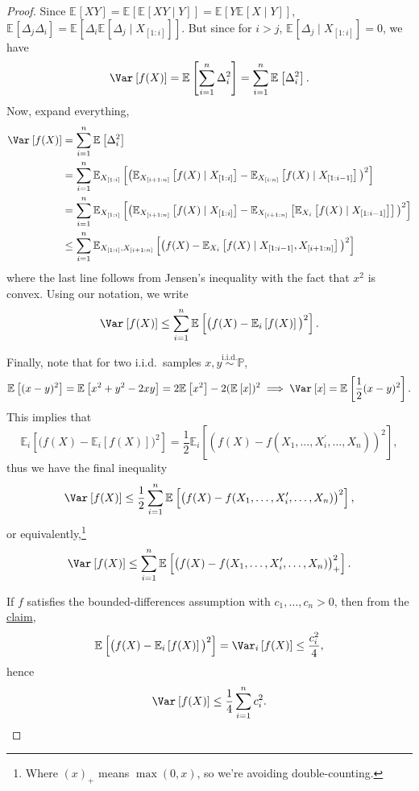 \begin{proof}
	Since \(\mathbb{E}_{}\left[XY \right] = \mathbb{E}_{}\left[\mathbb{E}_{}\left[XY \mid Y \right] \right] = \mathbb{E}_{}\left[Y \mathbb{E}_{}\left[X \mid Y \right] \right] \), \(\mathbb{E}_{}\left[\Delta _j \Delta _i \right] = \mathbb{E}_{}\left[\Delta _i \mathbb{E}_{}\left[\Delta _j \mid X_{[1:i]} \right] \right] \). But since for \(i > j\), \(\mathbb{E}_{}\left[\Delta _j \mid X_{[1:i]} \right] = 0\), we have
	\[
		\Var_{}\left[f(X) \right] = \mathbb{E}_{}\left[\sum_{i=1}^{n} \Delta _i^2 \right] = \sum_{i=1}^{n} \mathbb{E}_{}\left[\Delta _i^2 \right] .
	\]
	Now, expand everything,
	\[
		\begin{split}
			\Var_{}\left[f(X) \right]
			&= \sum_{i=1}^{n} \mathbb{E}_{}\left[\Delta _i^2 \right] \\
			&= \sum_{i=1}^{n} \mathbb{E}_{X_{[1:i]}}\left[\big( \mathbb{E}_{X_{[i+1:n]}}\left[f(X) \mid X_{[1:i]} \right] - \mathbb{E}_{X_{[i:n]}}\left[f(X) \mid X_{[1:i-1]} \right] \big)^2 \right] \\
			&= \sum_{i=1}^{n} \mathbb{E}_{X_{[1:i]}}\left[ \big( \mathbb{E}_{X_{[i+1:n]}}\left[f(X) \mid X_{[1:i]} \right] - \mathbb{E}_{X_{[i+1:n]}}\left[ \mathbb{E}_{X_i}\left[f(X) \mid X_{[1:i-1]} \right] \right] \big)^2 \right]\\
			&\leq \sum_{i=1}^{n} \mathbb{E}_{X_{[1:i]}, X_{[i+1:n]}}\left[\big( f(X) - \mathbb{E}_{X_i}\left[f(X) \mid X_{[1:i-1]}, X_{[i+1:n]} \right] \big)^2 \right]
		\end{split}
	\]
	where the last line follows from Jensen's inequality with the fact that \(x^2\) is convex. Using our notation, we write
	\[
		\Var_{}\left[f(X) \right] \leq \sum_{i=1}^{n} \mathbb{E}_{}\left[\big(f(X) - \mathbb{E}_{i}\left[f(X) \right] \big)^2\right] .
	\]

	Finally, note that for two i.i.d.\ samples \(x, y \overset{\text{i.i.d.} }{\sim } \mathbb{P} \),
	\[
		\mathbb{E}_{}\left[(x-y)^2 \right] = \mathbb{E}_{}\left[x^2 + y^2 - 2xy \right] = 2 \mathbb{E}_{}\left[x^2 \right] - 2(\mathbb{E}_{}\left[x \right] )^2
		\implies \Var_{}\left[x \right] = \mathbb{E}_{}\left[\frac{1}{2}(x-y)^2 \right].
	\]
	This implies that
	\[
		\mathbb{E}_{i}\left[\big(f(X) - \mathbb{E}_{i}\left[f(X) \right] \big)^2 \right]
		= \frac{1}{2} \mathbb{E}_{i}\left[(f(X) - f(X_1, \dots , X_i^{\prime} , \dots , X_n))^2 \right] ,
	\]
	thus we have the final inequality
	\[
		\Var_{}\left[f(X) \right]
		\leq \frac{1}{2}\sum_{i=1}^{n} \mathbb{E}_{}\left[\big( f(X) - f(X_1, \dots , X_i^{\prime} , \dots , X_n) \big)^2 \right],
	\]
	or equivalently,\footnote{Where \((x)_+\) means \(\max (0, x)\), so we're avoiding double-counting.}
	\[
		\Var_{}\left[f(X) \right]
		\leq \sum_{i=1}^{n} \mathbb{E}_{}\left[\big( f(X) - f(X_1, \dots , X_i^{\prime} , \dots , X_n) \big)_+^2 \right].
	\]

	If \(f\) satisfies the bounded-differences assumption with \(c_1, \dots , c_n > 0\), then from the \hyperref[clm:variance-bound]{claim},
	\[
		\mathbb{E}_{}\left[\big(f(X) - \mathbb{E}_{i}\left[f(X) \right] \big)^2\right]
		= \Var_{i}\left[f(X) \right]
		\leq \frac{c_i^2}{4},
	\]
	hence
	\[
		\Var_{}\left[f(X) \right]
		\leq \frac{1}{4}\sum_{i=1}^{n} c_i^2.
	\]
\end{proof}


